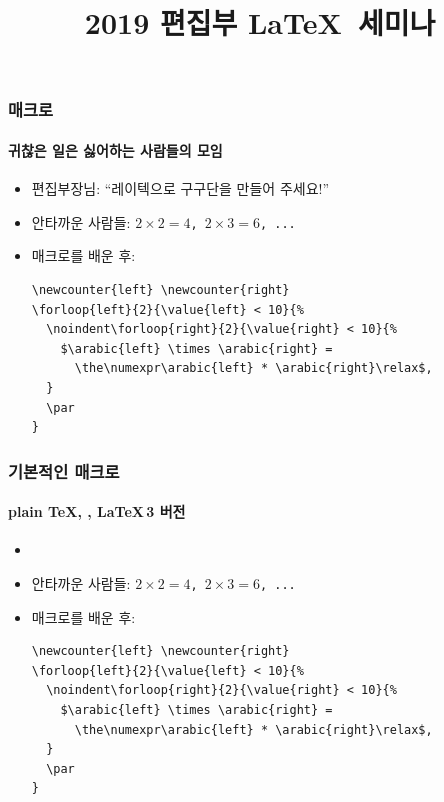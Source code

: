 \documentclass[10pt]{beamer}
\title[]{\bf2019 편집부 \LaTeX\ 세미나}
\author{}
\date{}
\institute{}
\begin{document}
\begin{frame}[plain]
\maketitle
\end{frame}





\begin{frame}[fragile]
  \frametitle{매크로}
  \framesubtitle{귀찮은 일은 싫어하는 사람들의 모임}
  \begin{itemize}
    \item<1-> 편집부장님: ``레이텍으로 구구단을 만들어 주세요!''
    \item<1-> 안타까운 사람들: \texttt{$2 \times 2 = 4$, $2 \times 3 = 6$, ...}
    \item<2-> 매크로를 배운 후:\vspace{-1em}
    \begin{verbatim}
\newcounter{left} \newcounter{right}
\forloop{left}{2}{\value{left} < 10}{%
  \noindent\forloop{right}{2}{\value{right} < 10}{%
    $\arabic{left} \times \arabic{right} =
      \the\numexpr\arabic{left} * \arabic{right}\relax$,
  }
  \par
}
    \end{verbatim}
  \end{itemize}
\end{frame}

\begin{frame}[fragile]
  \frametitle{기본적인 매크로}
  \framesubtitle{plain \TeX, \LaTeXe, \LaTeX\,3 버전}
  \begin{itemize}
    \item<1-> \texttt{\def\mymacro#1#2#3{\textit{#1}#2\textrm{#3}}}
    \item<1-> 안타까운 사람들: \texttt{$2 \times 2 = 4$, $2 \times 3 = 6$, ...}
    \item<2-> 매크로를 배운 후:\vspace{-1em}
    \begin{verbatim}
\newcounter{left} \newcounter{right}
\forloop{left}{2}{\value{left} < 10}{%
  \noindent\forloop{right}{2}{\value{right} < 10}{%
    $\arabic{left} \times \arabic{right} =
      \the\numexpr\arabic{left} * \arabic{right}\relax$,
  }
  \par
}
    \end{verbatim}
  \end{itemize}
\end{frame}
\end{document}

